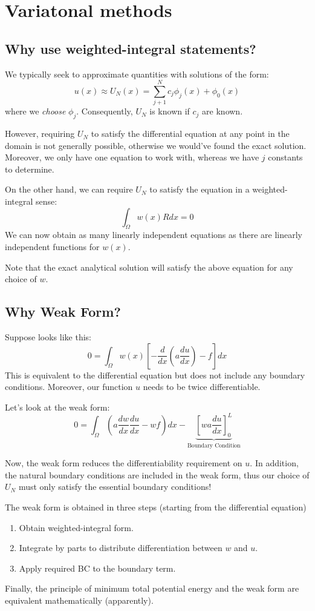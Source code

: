 \documentclass{article}
\begin{document}
\section{Variatonal methods}
\subsection{Why use weighted-integral statements?}
We typically seek to approximate quantities with solutions of the form:
\begin{equation}
u(x) \approx U_N(x) = \sum_{j+1}^N c_j \phi_j (x) + \phi_0 (x)
\end{equation}
where we \textit{choose} $\phi_j$. Consequently, $U_N$ is known if $c_j$ are known.

However, requiring $U_N$ to satisfy the differential equation at any point in the domain
is not generally possible, otherwise we would've found the exact solution. Moreover, we
only have one equation to work with, whereas we have $j$ constants to determine.

On the other hand, we can require $U_N$ to satisfy the equation in a weighted-integral sense:
$$
\int_\Omega w(x) R dx = 0
\label{eq:weighted-integral}
$$
We can now obtain as many linearly independent equations as there are linearly independent
functions for $w(x)$.

Note that the exact analytical solution will satisfy the above equation for any choice of
$w$.
\subsection{Why Weak Form?}
\label{sec:weakform}
Suppose  looks like this:
$$
0 = \int_\Omega w(x) \left[ -\frac{d}{dx} \left(a \frac{du}{dx} \right) - f \right] dx
$$
This is equivalent to the differential equation but does not include any boundary conditions.
Moreover, our function $u$ needs to be twice differentiable.

Let's look at the weak form:
$$
0 = \int_\Omega \left( a \frac{dw}{dx}\frac{du}{dx} - wf \right) dx
- \underbrace{\left[ wa \frac{du}{dx} \right]^L_0}_\text{Boundary Condition}
$$

Now, the weak form reduces the differentiability requirement on $u$. In addition, the natural
boundary conditions are included in the weak form, thus our choice of $U_N$ must only satisfy
the essential boundary conditions!

The weak form is obtained in three steps (starting from the differential equation)
\begin{enumerate}
    \item Obtain weighted-integral form.
    \item Integrate by parts to distribute differentiation between $w$ and $u$.
    \item Apply required BC to the boundary term.
\end{enumerate}
Finally, the principle of minimum total potential energy and the weak form are equivalent
mathematically (apparently).
\end{document}
